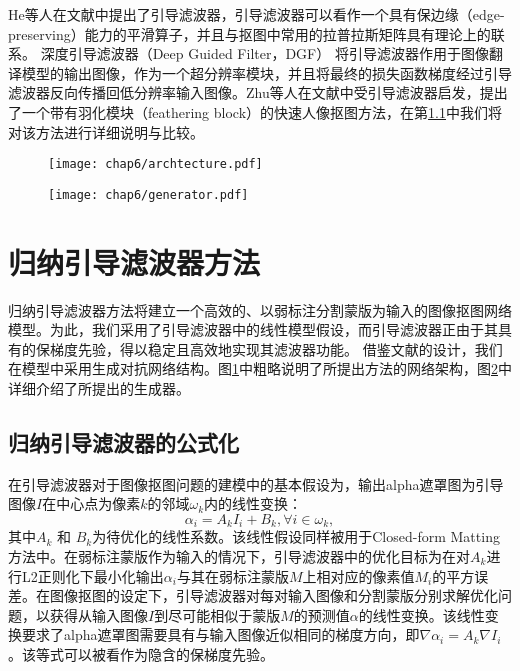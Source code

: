 He等人在文献\parencite{he2010guided}中提出了引导滤波器，引导滤波器可以看作一个具有保边缘（edge-preserving）能力的平滑算子，并且与抠图中常用的拉普拉斯矩阵具有理论上的联系。
深度引导滤波器（Deep Guided Filter，DGF）\cite{wu2018fast} 将引导滤波器作用于图像翻译模型的输出图像，作为一个超分辨率模块，并且将最终的损失函数梯度经过引导滤波器反向传播回低分辨率输入图像。Zhu等人在文献\parencite{zhu2017fast}中受引导滤波器启发，提出了一个带有羽化模块（feathering block）的快速人像抠图方法，在第\ref{sec6:igf}中我们将对该方法进行详细说明与比较。

\begin{figure}[t]
	\centering
	\texttt{[image: chap6/archtecture.pdf]}
	\label{fig6:archtecture}
\end{figure}
\begin{figure}[t]
	\centering
	\texttt{[image: chap6/generator.pdf]}
	\label{fig6:generator}
\end{figure}

\section{归纳引导滤波器方法}
归纳引导滤波器方法将建立一个高效的、以弱标注分割蒙版为输入的图像抠图网络模型。为此，我们采用了引导滤波器\cite{he2010guided}中的线性模型假设，而引导滤波器正由于其具有的保梯度先验，得以稳定且高效地实现其滤波器功能。
借鉴文献\parencite{lutz2018alphagan}的设计，我们在模型中采用生成对抗网络\cite{goodfellow2014generative}结构。图\ref{fig6:archtecture}中粗略说明了所提出方法的网络架构，图\ref{fig6:generator}中详细介绍了所提出的生成器。

\subsection{归纳引导滤波器的公式化}
\label{sec6:igf}
在引导滤波器\cite{he2010guided}对于图像抠图问题的建模中的基本假设为，输出alpha遮罩图为引导图像$I$在中心点为像素$k$的邻域$\omega_k$内的线性变换：
\begin{equation}
\alpha_i = A_{k}I_{i} + B_{k}, \forall i \in \omega_k,
\end{equation}
其中$ A_{k} $ 和 $ B_{k} $为待优化的线性系数。该线性假设同样被用于Closed-form Matting\cite{levin2008closed}方法中。在弱标注蒙版作为输入的情况下，引导滤波器中的优化目标为在对$A_{k}$进行L2正则化下最小化输出$\alpha_i$与其在弱标注蒙版$ M $上相对应的像素值$M_i$的平方误差。在图像抠图的设定下，引导滤波器对每对输入图像和分割蒙版分别求解优化问题，以获得从输入图像$I$到尽可能相似于蒙版$M$的预测值$\alpha$的线性变换。该线性变换要求了alpha遮罩图需要具有与输入图像近似相同的梯度方向，即$ \nabla \alpha_i=A_k \nabla I_i $。该等式可以被看作为隐含的保梯度先验。

